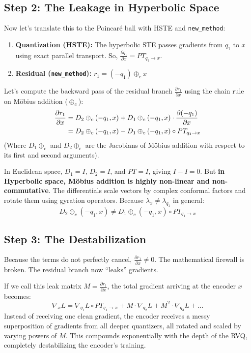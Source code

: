 \documentclass{article}
\begin{document}
\subsection*{Step 2: The Leakage in Hyperbolic Space}
Now let's translate this to the Poincaré ball with HSTE and \texttt{new\_method}:
\begin{enumerate}
    \item \textbf{Quantization (HSTE):} The hyperbolic STE passes gradients from $q_1$ to $x$ using exact parallel transport. So, $\frac{\partial q_1}{\partial x} = PT_{q_1 \to x}$.
    \item \textbf{Residual (\texttt{new\_method}):} $r_1 = (-q_1) \oplus_c x$
\end{enumerate}

Let's compute the backward pass of the residual branch $\frac{\partial r_1}{\partial x}$ using the chain rule on Möbius addition ($\oplus_c$):
\begin{align}
    \frac{\partial r_1}{\partial x} &= D_2 \oplus_c(-q_1, x) + D_1 \oplus_c(-q_1, x) \cdot \frac{\partial (-q_1)}{\partial x} \notag \\
    &= D_2 \oplus_c(-q_1, x) - D_1 \oplus_c(-q_1, x) \circ PT_{q_1 \to x}
\end{align}
(Where $D_1 \oplus_c$ and $D_2 \oplus_c$ are the Jacobians of Möbius addition with respect to its first and second arguments).

In Euclidean space, $D_1=I$, $D_2=I$, and $PT=I$, giving $I - I = 0$. But \textbf{in Hyperbolic space, Möbius addition is highly non-linear and non-commutative}. The differentials scale vectors by complex conformal factors and rotate them using gyration operators. Because $\lambda_x \neq \lambda_{q_1}$ in general:
\begin{equation}
    D_2 \oplus_c(-q_1, x) \neq D_1 \oplus_c(-q_1, x) \circ PT_{q_1 \to x}
\end{equation}

\subsection*{Step 3: The Destabilization}
Because the terms do not perfectly cancel, $\frac{\partial r_1}{\partial x} \neq 0$. The mathematical firewall is broken. The residual branch now ``leaks'' gradients. 

If we call this leak matrix $M = \frac{\partial r_1}{\partial x}$, the total gradient arriving at the encoder $x$ becomes:
\begin{equation}
    \nabla_x L = \nabla_{q_1} L \circ PT_{q_1 \to x} + M \cdot \nabla_{q_2} L + M^2 \cdot \nabla_{q_3} L + \dots
\end{equation}
Instead of receiving one clean gradient, the encoder receives a messy superposition of gradients from all deeper quantizers, all rotated and scaled by varying powers of $M$. This compounds exponentially with the depth of the RVQ, completely destabilizing the encoder's training.
\end{document}
